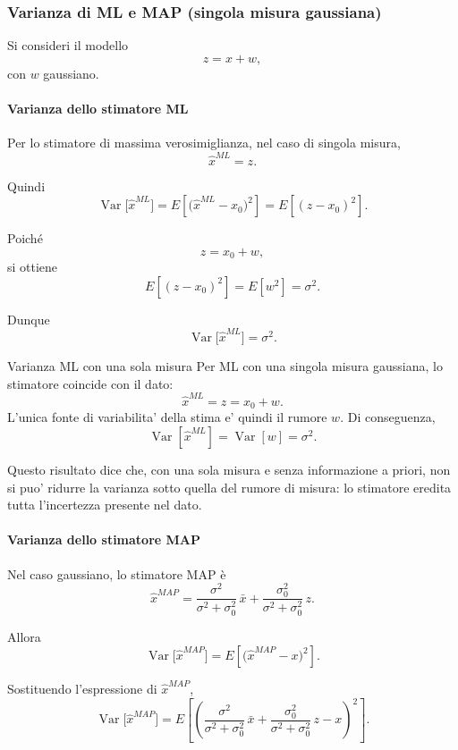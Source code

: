 \documentclass[11pt,a4paper]{article}
\begin{document}
\subsubsection*{Varianza di ML e MAP (singola misura gaussiana)}

Si consideri il modello
\[
z=x+w,
\]
con \(w\) gaussiano.

\paragraph{Varianza dello stimatore ML}

Per lo stimatore di massima verosimiglianza, nel caso di singola misura,
\[
\hat x^{ML}=z.
\]

Quindi
\[
\operatorname{Var}\!\bigl[\hat x^{ML}\bigr]
=
E\!\left[\bigl(\hat x^{ML}-x_0\bigr)^2\right]
=
E\!\left[(z-x_0)^2\right].
\]

Poiché
\[
z=x_0+w,
\]
si ottiene
\[
E\!\left[(z-x_0)^2\right]
=
E[w^2]
=
\sigma^2.
\]

Dunque
\[
\operatorname{Var}\!\bigl[\hat x^{ML}\bigr]=\sigma^2.
\]

\begin{spiegazione}{Varianza ML con una sola misura}
Per ML con una singola misura gaussiana, lo stimatore coincide con il dato:
\[
\hat x^{ML}=z=x_0+w.
\]
L'unica fonte di variabilita' della stima e' quindi il rumore $w$. Di conseguenza,
\[
\operatorname{Var}[\hat x^{ML}]
=
\operatorname{Var}[w]
=
\sigma^2.
\]

Questo risultato dice che, con una sola misura e senza informazione a priori, non si puo' ridurre la varianza sotto quella del rumore di misura: lo stimatore eredita tutta l'incertezza presente nel dato.
\end{spiegazione}

\paragraph{Varianza dello stimatore MAP}

Nel caso gaussiano, lo stimatore MAP è
\[
\hat x^{MAP}
=
\frac{\sigma^2}{\sigma^2+\sigma_0^2}\,\bar x
+
\frac{\sigma_0^2}{\sigma^2+\sigma_0^2}\,z.
\]

Allora
\[
\operatorname{Var}\!\bigl[\hat x^{MAP}\bigr]
=
E\!\left[\bigl(\hat x^{MAP}-x\bigr)^2\right].
\]

Sostituendo l'espressione di \(\hat x^{MAP}\),
\[
\operatorname{Var}\!\bigl[\hat x^{MAP}\bigr]
=
E\!\left[
\left(
\frac{\sigma^2}{\sigma^2+\sigma_0^2}\,\bar x
+
\frac{\sigma_0^2}{\sigma^2+\sigma_0^2}\,z
-x
\right)^2
\right].
\]
\end{document}
